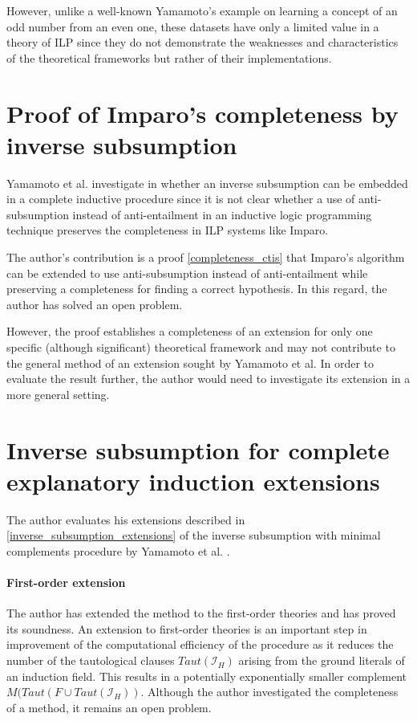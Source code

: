 However, unlike a well-known Yamamoto's example \cite{yamamoto1997hypotheses} on learning a concept of an odd number from an even one, these datasets have only a limited value in a theory of ILP since they do not demonstrate the weaknesses and characteristics of the theoretical frameworks but rather of their implementations. 

\section{Proof of Imparo's completeness by inverse subsumption}
Yamamoto et al. investigate in \cite{yamamoto2012inverse} whether an inverse subsumption can be embedded in a complete inductive procedure since it is not clear whether a use of anti-subsumption instead of anti-entailment in an inductive logic programming technique preserves the completeness in ILP systems like Imparo.

The author's contribution is a proof \ref{completeness_ctis} that Imparo's algorithm can be extended to use anti-subsumption instead of anti-entailment while preserving a completeness for finding a correct hypothesis. In this regard, the author has solved an open problem.

However, the proof establishes a completeness of an extension for only one specific (although significant) theoretical framework and may not contribute to the general method of an extension sought by Yamamoto et al. In order to evaluate the result further, the author would need to investigate its extension in a more general setting.

\section{Inverse subsumption for complete explanatory induction extensions}
The author evaluates his extensions described in \ref{inverse_subsumption_extensions} of the inverse subsumption with minimal complements procedure by Yamamoto et al. \cite{yamamoto2012inverse}.

\paragraph{First-order extension}
The author has extended the method to the first-order theories and has proved its soundness. An extension to first-order theories is an important step in improvement of the computational efficiency of the procedure as it reduces the number of the tautological clauses $Taut(\mathcal{I}_H)$ arising from the ground literals of an induction field. This results in a potentially exponentially smaller complement $M(Taut(F \cup Taut(\mathcal{I}_H))$. Although the author investigated the completeness of a method, it remains an open problem.

